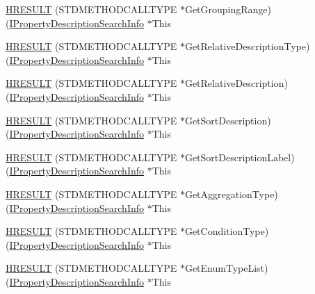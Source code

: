 \begin{DoxyCompactItemize}
\item 
\hyperlink{struct_i_property_description_search_info_vtbl_acbf15c343cb15576ba7ab0c71fe17625}{H\+R\+E\+S\+U\+LT} (S\+T\+D\+M\+E\+T\+H\+O\+D\+C\+A\+L\+L\+T\+Y\+PE $\ast$Get\+Grouping\+Range)(\hyperlink{propsys_8h_af859793a501f0bcd88d72a4382caa467}{I\+Property\+Description\+Search\+Info} $\ast$This
\item 
\hyperlink{struct_i_property_description_search_info_vtbl_a8bed1bfaffd0b53dc07cff8c5f3a7f2f}{H\+R\+E\+S\+U\+LT} (S\+T\+D\+M\+E\+T\+H\+O\+D\+C\+A\+L\+L\+T\+Y\+PE $\ast$Get\+Relative\+Description\+Type)(\hyperlink{propsys_8h_af859793a501f0bcd88d72a4382caa467}{I\+Property\+Description\+Search\+Info} $\ast$This
\item 
\hyperlink{struct_i_property_description_search_info_vtbl_aaddfb8466e5b40d77a4e704449b35d25}{H\+R\+E\+S\+U\+LT} (S\+T\+D\+M\+E\+T\+H\+O\+D\+C\+A\+L\+L\+T\+Y\+PE $\ast$Get\+Relative\+Description)(\hyperlink{propsys_8h_af859793a501f0bcd88d72a4382caa467}{I\+Property\+Description\+Search\+Info} $\ast$This
\item 
\hyperlink{struct_i_property_description_search_info_vtbl_ac7cf4af8454480a5f62fa0861cdcb241}{H\+R\+E\+S\+U\+LT} (S\+T\+D\+M\+E\+T\+H\+O\+D\+C\+A\+L\+L\+T\+Y\+PE $\ast$Get\+Sort\+Description)(\hyperlink{propsys_8h_af859793a501f0bcd88d72a4382caa467}{I\+Property\+Description\+Search\+Info} $\ast$This
\item 
\hyperlink{struct_i_property_description_search_info_vtbl_a6e62286fbef8bd2d5e015a743656490d}{H\+R\+E\+S\+U\+LT} (S\+T\+D\+M\+E\+T\+H\+O\+D\+C\+A\+L\+L\+T\+Y\+PE $\ast$Get\+Sort\+Description\+Label)(\hyperlink{propsys_8h_af859793a501f0bcd88d72a4382caa467}{I\+Property\+Description\+Search\+Info} $\ast$This
\item 
\hyperlink{struct_i_property_description_search_info_vtbl_a2404b78034b62c3b525b56f0ee2ab718}{H\+R\+E\+S\+U\+LT} (S\+T\+D\+M\+E\+T\+H\+O\+D\+C\+A\+L\+L\+T\+Y\+PE $\ast$Get\+Aggregation\+Type)(\hyperlink{propsys_8h_af859793a501f0bcd88d72a4382caa467}{I\+Property\+Description\+Search\+Info} $\ast$This
\item 
\hyperlink{struct_i_property_description_search_info_vtbl_a1742c5a228b968ff39ffbc194babc542}{H\+R\+E\+S\+U\+LT} (S\+T\+D\+M\+E\+T\+H\+O\+D\+C\+A\+L\+L\+T\+Y\+PE $\ast$Get\+Condition\+Type)(\hyperlink{propsys_8h_af859793a501f0bcd88d72a4382caa467}{I\+Property\+Description\+Search\+Info} $\ast$This
\item 
\hyperlink{struct_i_property_description_search_info_vtbl_a063104473525f6a0bb16e3aace0c8ec7}{H\+R\+E\+S\+U\+LT} (S\+T\+D\+M\+E\+T\+H\+O\+D\+C\+A\+L\+L\+T\+Y\+PE $\ast$Get\+Enum\+Type\+List)(\hyperlink{propsys_8h_af859793a501f0bcd88d72a4382caa467}{I\+Property\+Description\+Search\+Info} $\ast$This

\end{DoxyCompactItemize}
